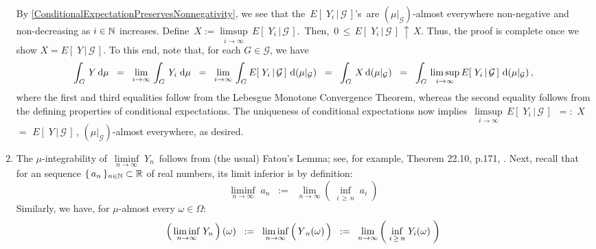 \begin{enumerate}
	By \eqref{ConditionalExpectationPreservesNonnegativity}, we see that the
	\,$E\!\left[\;Y_{i}\,\vert\,\mathcal{G}\,\right]$'s\,
	are $(\mu\vert_{\mathcal{G}})$-almost everywhere non-negative and non-decreasing as $i \in \mathbb{N}$ increases.
	Define \,$X := \underset{i\rightarrow\infty}{\limsup}\,E\!\left[\;Y_{i}\,\vert\,\mathcal{G}\,\right]$.\,
	Then, \,$0\,\leq\,E\!\left[\;Y_{i}\,\vert\,\mathcal{G}\,\right] \,\uparrow\, X$.
	Thus, the proof is complete once we show $X = E\!\left[\;Y\,\vert\,\mathcal{G}\,\right]$.
	To this end, note that, for each $G \in \mathcal{G}$, we have
	\begin{equation*}
	\int_{G}\,Y\,\textnormal{d}\mu
	\;\;=\;\;
	\underset{i\rightarrow\infty}{\lim}\,\int_{G}\,Y_{i}\;\textnormal{d}\mu
	\;\;=\;\;
	\underset{i\rightarrow\infty}{\lim}\,\int_{G}E\!\left[\;Y_{i}\,\vert\,\mathcal{G}\,\right]\,\textnormal{d}(\mu\vert_{\mathcal{G}})
	\;\;=\;\;
	\int_{G}\,X\,\textnormal{d}(\mu\vert_{\mathcal{G}})
	\;\;=\;\;
	\int_{G}\,\underset{i\rightarrow\infty}{\limsup}\,E\!\left[\;Y_{i}\,\vert\,\mathcal{G}\,\right]\,\textnormal{d}(\mu\vert_{\mathcal{G}})\,,
	\end{equation*}
	where the first and third equalities follow from the Lebesgue Monotone Convergence Theorem,
	whereas the second equality follows from the defining properties of conditional expectations.
	The uniqueness of conditional expectations now implies
	\,$\underset{i\rightarrow\infty}{\limsup}\,E\!\left[\;Y_{i}\,\vert\,\mathcal{G}\,\right]$
	\,$=:$ $X$ $=$ $E\!\left[\;Y\,\vert\,\mathcal{G}\,\right]$\,,
	$(\mu\vert_{\mathcal{G}})$-almost everywhere, as desired.
\item
	The $\mu$-integrability of \,$\underset{n\rightarrow\infty}{\liminf}\;Y_{n}$\, follows from (the usual)
	Fatou's Lemma; see, for example, Theorem 22.10, p.171, \cite{Aliprantis1998}.
	Next, recall that for an sequence $\{\,a_{n}\,\}_{n\in\mathbb{N}} \subset \mathbb{R}$ of real numbers, its limit inferior is by definition:
	\begin{equation*}
	\underset{n\rightarrow\infty}{\liminf}\;a_{n}
	\;\; := \;\;
		\underset{n\rightarrow\infty}{\lim}\left(\;\underset{i\,\geq\,n}{\inf}\;a_{i}\;\right)
	\end{equation*}
	Similarly, we have, for $\mu$-almost every $\omega \in \Omega$:
	\begin{equation*}
	\left(\,\underset{n\rightarrow\infty}{\liminf}\;Y_{n}\,\right)(\omega)
	\;\; := \;\;
	\underset{n\rightarrow\infty}{\liminf}\left(\,\overset{{\color{white}.}}{Y}_{n}(\omega)\,\right)
	\;\; := \;\;
		\underset{n\rightarrow\infty}{\lim}\left(\;\underset{i\,\geq\,n}{\inf}\;Y_{i}(\omega)\;\right)

\end{equation*}
\end{enumerate}
